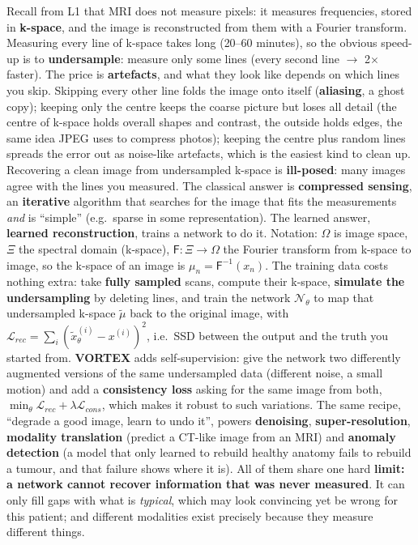 \documentclass[a4paper]{article}
\newcommand{\K}[1]{\textcolor{kg}{\textbf{#1}}}
\newcommand{\F}[1]{\textcolor{fb}{#1}}
\newcommand{\E}[1]{\textcolor{ep}{#1}}
\newcommand{\T}[1]{\textcolor{tr}{\textbf{#1}}}
\newcommand{\ra}{\ensuremath{\to}}
\newcommand{\Om}{\Omega}
\begin{document}
Recall from L1 that MRI does not measure pixels: it measures frequencies, stored in \K{k-space}, and the image is reconstructed from them with a Fourier transform. Measuring every line of k-space takes long (\E{20--60 minutes}), so the obvious speed-up is to \K{undersample}: measure only some lines (\E{every second line \ra{} 2$\times$ faster}). The price is \T{artefacts}, and what they look like depends on which lines you skip. Skipping every other line folds the image onto itself (\K{aliasing}, a ghost copy); keeping only the centre keeps the coarse picture but loses all detail (the centre of k-space holds overall shapes and contrast, the outside holds edges, the same idea JPEG uses to compress photos); keeping the centre plus random lines spreads the error out as noise-like artefacts, which is the easiest kind to clean up.
Recovering a clean image from undersampled k-space is \K{ill-posed}: many images agree with the lines you measured. The classical answer is \K{compressed sensing}, an \K{iterative} algorithm that searches for the image that fits the measurements \emph{and} is ``simple'' (e.g.\ sparse in some representation). The learned answer, \K{learned reconstruction}, trains a network to do it. Notation: $\Om$ is image space, $\Xi$ the spectral domain (k-space), $\mathsf F:\Xi\to\Om$ the Fourier transform from k-space to image, so the k-space of an image is \F{$\mu_n=\mathsf F^{-1}(x_n)$}. The training data costs nothing extra: take \K{fully sampled} scans, compute their k-space, \K{simulate the undersampling} by deleting lines, and train the network $\mathcal N_\theta$ to map that undersampled k-space $\tilde\mu$ back to the original image, with \F{$\mathcal L_{rec}=\sum_i(\tilde x_\theta^{(i)}-x^{(i)})^2$}, i.e.\ SSD between the output and the truth you started from. \K{VORTEX} adds self-supervision: give the network two differently augmented versions of the same undersampled data (\E{different noise, a small motion}) and add a \K{consistency loss} asking for the same image from both, $\min_\theta\mathcal L_{rec}+\lambda\mathcal L_{cons}$, which makes it robust to such variations.
The same recipe, ``degrade a good image, learn to undo it'', powers \K{denoising}, \K{super-resolution}, \K{modality translation} (\E{predict a CT-like image from an MRI}) and \K{anomaly detection} (a model that only learned to rebuild healthy anatomy fails to rebuild a tumour, and that failure shows where it is). All of them share one hard \T{limit: a network cannot recover information that was never measured}. It can only fill gaps with what is \emph{typical}, which may look convincing yet be wrong for this patient; and different modalities exist precisely because they measure different things.
\end{document}
